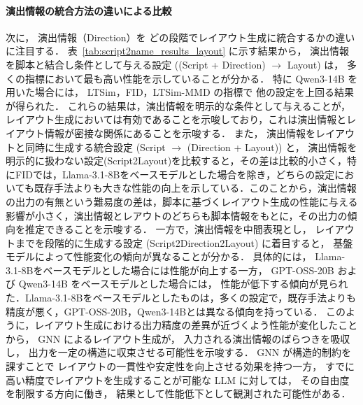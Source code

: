 \documentclass[a4j,12pt,dvipdfmx]{jsreport}
\begin{document}
\paragraph{演出情報の統合方法の違いによる比較}
次に，
演出情報（Direction）を
どの段階でレイアウト生成に統合するかの違いに注目する．
表~\ref{tab:script2name_results_layout} に示す結果から，
演出情報を脚本と結合し条件として与える設定
((Script + Direction) $\rightarrow$ Layout) は，
多くの指標において最も高い性能を示していることが分かる．
特に Qwen3-14B を用いた場合には，
LTSim，FID，LTSim-MMD の指標で
他の設定を上回る結果が得られた．
これらの結果は，演出情報を明示的な条件として与えることが，
レイアウト生成においては有効であることを示唆しており，これは演出情報とレイアウト情報が密接な関係にあることを示唆する．
また，
演出情報をレイアウトと同時に生成する統合設定
(Script $\rightarrow$ (Direction + Layout)) と，
演出情報を明示的に扱わない設定(Script2Layout)を比較すると，その差は比較的小さく，特にFIDでは，Llama-3.1-8Bをベースモデルとした場合を除き，どちらの設定においても既存手法よりも大きな性能の向上を示している．このことから，演出情報の出力の有無という難易度の差は，脚本に基づくレイアウト生成の性能に与える影響が小さく，演出情報とレアウトのどちらも脚本情報をもとに，その出力の傾向を推定できることを示唆する．
一方で，演出情報を中間表現とし，
レイアウトまでを段階的に生成する設定
(Script2Direction2Layout) に着目すると，
基盤モデルによって性能変化の傾向が異なることが分かる．
具体的には，
Llama-3.1-8Bをベースモデルとした場合には性能が向上する一方，
GPT-OSS-20B および Qwen3-14B をベースモデルとした場合には，
性能が低下する傾向が見られた．Llama-3.1-8Bをベースモデルとしたものは，多くの設定で，既存手法よりも精度が悪く，GPT-OSS-20B，Qwen3-14Bとは異なる傾向を持っている．
このように，レイアウト生成における出力精度の差異が近づくよう性能が変化したことから，
GNN によるレイアウト生成が，
入力される演出情報のばらつきを吸収し，
出力を一定の構造に収束させる可能性を示唆する．
GNN が構造的制約を課すことで
レイアウトの一貫性や安定性を向上させる効果を持つ一方，
すでに高い精度でレイアウトを生成することが可能な LLM に対しては，
その自由度を制限する方向に働き，
結果として性能低下として観測された可能性がある．
\end{document}
